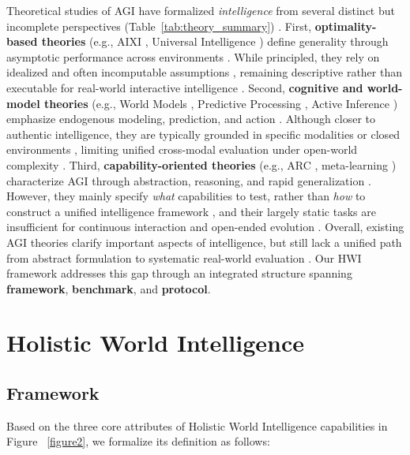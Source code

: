 Theoretical studies of AGI have formalized \emph{intelligence} from several distinct but incomplete perspectives (Table~\ref{tab:theory_summary}) \cite{legg2007collection}.
First, \textbf{optimality-based theories} (e.g., AIXI \cite{hutter2005universal}, Universal Intelligence \cite{legg2007universal}) define generality through asymptotic performance across environments \cite{sutton1998reinforcement}.
While principled, they rely on idealized and often incomputable assumptions \cite{leike2017ai}, remaining descriptive rather than executable for real-world interactive intelligence \cite{everitt2018agi}.
Second, \textbf{cognitive and world-model theories} (e.g., World Models \cite{ha2018recurrent}, Predictive Processing \cite{friston2010free}, Active Inference \cite{zhiren2026learning}) emphasize endogenous modeling, prediction, and action \cite{matsuo2022deep}.
Although closer to authentic intelligence, they are typically grounded in specific modalities or closed environments \cite{kaiser2019model}, limiting unified cross-modal evaluation under open-world complexity \cite{hafner2019dream}.
Third, \textbf{capability-oriented theories} (e.g., ARC \cite{chollet2019measure}, meta-learning \cite{finn2017model}) characterize AGI through abstraction, reasoning, and rapid generalization \cite{lake2017building}.
However, they mainly specify \emph{what} capabilities to test, rather than \emph{how} to construct a unified intelligence framework \cite{lecun2022path}, and their largely static tasks are insufficient for continuous interaction and open-ended evolution \cite{team2021open}.
Overall, existing AGI theories clarify important aspects of intelligence, but still lack a unified path from abstract formulation to systematic real-world evaluation \cite{bommasani2021opportunities}.
Our HWI framework addresses this gap through an integrated structure spanning \textbf{framework}, \textbf{benchmark}, and \textbf{protocol}.


\section{Holistic World Intelligence} 
\label{sec:mhlc-benchmark}
\subsection{Framework}
\label{formulation}
Based on the three core attributes of Holistic World Intelligence capabilities in Figure ~\ref{figure2}, we formalize its definition as follows:

